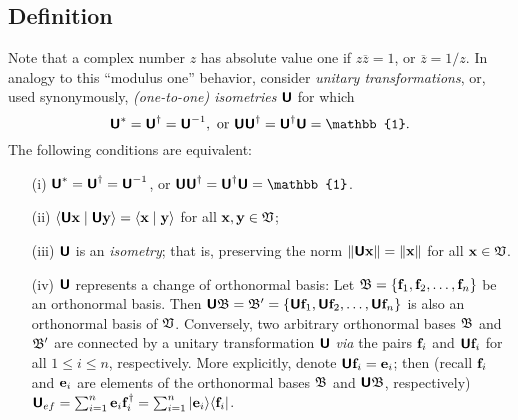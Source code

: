 \subsection {Definition}
Note that a complex number $z$ has absolute value one if $z\overline{z}=1$, or $\overline{z}=1/z$.
In analogy to this ``modulus one'' behavior,
consider {\em unitary transformations}, or, used synonymously, {\em (one-to-one) isometries}
$\textsf{\textbf{U}}$ for which
\begin{equation}
\textsf{\textbf{U}}^\ast = \textsf{\textbf{U}}^\dagger =\textsf{\textbf{U}}^{-1},
\textrm{ or } \textsf{\textbf{U}}\textsf{\textbf{U}}^\dagger =\textsf{\textbf{U}}^\dagger \textsf{\textbf{U}}=\mathbb{1}.
\end{equation}
The following conditions are equivalent:
\begin{itemize}
\item[(i)]
$\textsf{\textbf{U}}^\ast = \textsf{\textbf{U}}^\dagger =\textsf{\textbf{U}}^{-1}$,
or $\textsf{\textbf{U}}\textsf{\textbf{U}}^\dagger =\textsf{\textbf{U}}^\dagger \textsf{\textbf{U}}=\mathbb{1}$.
\item[(ii)]
$\langle \textsf{\textbf{U}}{\bf x}\mid \textsf{\textbf{U}}{\bf y} \rangle
=
\langle {\bf x}\mid {\bf y} \rangle$ for all ${\bf x} ,{\bf y} \in {\frak V}$;
\item[(iii)]  $\textsf{\textbf{U}}$ is an {\em isometry};
that is, preserving the norm
$\| \textsf{\textbf{U}}{\bf x}\|
=
\|{\bf x}\|$ for all ${\bf x}  \in {\frak V}$.
\item[(iv)]
$\textsf{\textbf{U}}$ represents a change of orthonormal basis:\cite{Schwinger.60}
Let ${\frak B}=\{{\bf f}_1,  {\bf f}_2, \ldots , {\bf f}_n\}$
be an orthonormal basis.
Then
$\textsf{\textbf{U}}{\frak B}={\frak B}'=\{\textsf{\textbf{U}}{\bf f}_1, \textsf{\textbf{U}} {\bf f}_2,
\ldots ,\textsf{\textbf{U}} {\bf f}_n\}$
is also an orthonormal basis of  ${\frak V}$.
Conversely, two arbitrary orthonormal bases
${\frak B}$
and
${\frak B}'$
are connected by a unitary transformation $\textsf{\textbf{U}}$ {\it via} the pairs  ${\bf f}_i$ and $ \textsf{\textbf{U}}{\bf f}_i$
for all $1\le i \le n$, respectively.
More explicitly, denote  $\textsf{\textbf{U}} {\bf f}_i   = {\bf e}_i$; then
(recall ${\bf f}_i$ and ${\bf e}_i$ are elements of the orthonormal bases
$  {\frak B} $  and $ \textsf{\textbf{U}} {\frak B} $, respectively)
$\textsf{\textbf{U}}_{ef}   = \sum_{i=1}^n{\bf e}_i  {\bf f}_i^\dagger
 = \sum_{i=1}^n \vert {\bf e}_i \rangle \langle {\bf f}_i \vert$.
\end{itemize}

